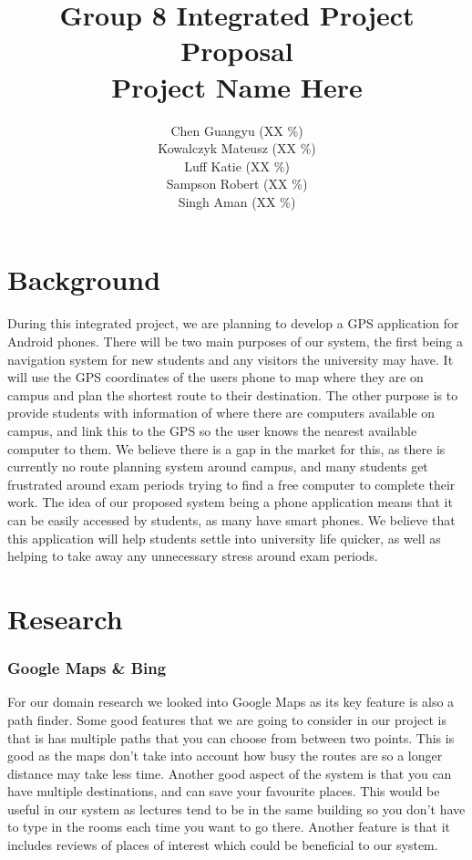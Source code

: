 \documentclass[10pt,a4paper,oneside]{report}
\begin{document}
\title{Group 8 Integrated Project Proposal\\Project Name Here}

\author{
  Chen Guangyu (XX \%)\\
  Kowalczyk Mateusz (XX \%)\\
  Luff Katie (XX \%)\\
  Sampson Robert (XX \%)\\
  Singh Aman (XX \%)\\ }
\maketitle
\section*{Background}
During this integrated project, we are planning to develop a GPS application for Android phones. There will be two main purposes of our system, the first being a navigation system for new students and any visitors the university may have. It will use the GPS coordinates of the users phone to map where they are on campus and plan the shortest route to their destination. The other purpose is to provide students with information of where there are computers available on campus, and link this to the GPS so the user knows the nearest available computer to them.
We believe there is a gap in the market for this, as there is currently no route planning system around campus, and many students get frustrated around exam periods trying to find a free computer to complete their work. The idea of our proposed system being a phone application means that it can be easily accessed by students, as many have smart phones. We believe that this application will help students settle into university life quicker, as well as helping to take away any unnecessary stress around exam periods.

\section*{Research}

\subsubsection*{Google Maps \& Bing}
For our domain research we looked into Google Maps as its key feature is also a path finder. Some good features that we are going to consider in our project is that is has multiple paths that you can choose from between two points. This is good as the maps don't take into account how busy the routes are so a longer distance may take less time. Another good aspect of the system is that you can have multiple destinations, and can save your favourite places. This would be useful in our system as lectures tend to be in the same building so you don't have to type in the rooms each time you want to go there. Another feature is that it includes reviews of places of interest which could be beneficial to our system.
\end{document}
